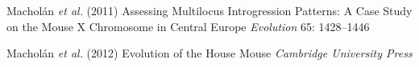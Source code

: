 \documentclass[30pt, a0paper, portrait, margin=0mm, innermargin=15mm,
               blockverticalspace=15mm, colspace=15mm, subcolspace=8mm]{tikzposter}
\begin{document}
\begin{columns}
{\begin{small}
          \hangindent=2cm Machol\'{a}n \textit{et al.} (2011) Assessing Multilocus Introgression Patterns: A Case Study on the Mouse X Chromosome in Central Europe \textit{Evolution} 65: 1428--1446

          \hangindent=2cm Machol\'{a}n \textit{et al.} (2012) Evolution of the House Mouse
          \textit{Cambridge University Press}
          
        
          
        \end{small}
      }

\end{columns}

\end{document}
